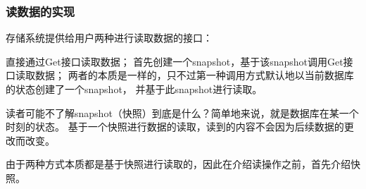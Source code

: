 	\subsubsection{读数据的实现}

	存储系统提供给用户两种进行读取数据的接口：

	直接通过Get接口读取数据；
	首先创建一个snapshot，基于该snapshot调用Get接口读取数据；
	两者的本质是一样的，只不过第一种调用方式默认地以当前数据库的状态创建了一个snapshot，
	并基于此snapshot进行读取。

	读者可能不了解snapshot（快照）到底是什么？简单地来说，就是数据库在某一个时刻的状态。
	基于一个快照进行数据的读取，读到的内容不会因为后续数据的更改而改变。
	
	由于两种方式本质都是基于快照进行读取的，因此在介绍读操作之前，首先介绍快照。

